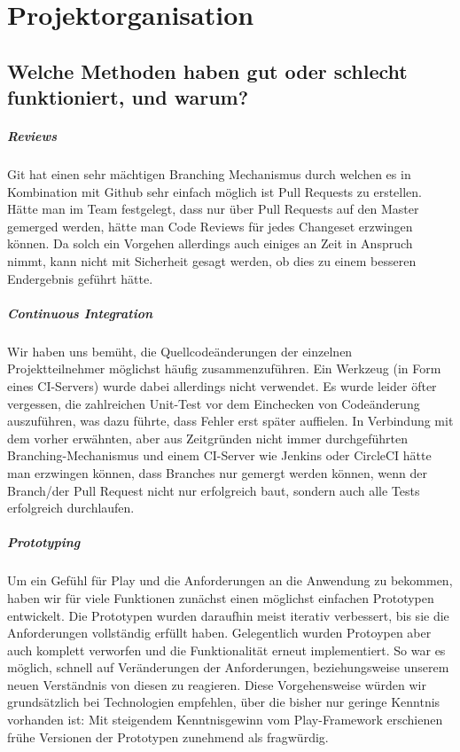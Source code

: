 \documentclass[12pt,DIV14,BCOR10mm,a4paper,parskip=half-,headsepline,headinclude,english,ngerman,bibliography=totocnumbered]{scrreprt}
\begin{document}
\vspace*{-3cm}

\tableofcontents  %

\chapter{Projektorganisation}


\section{Welche Methoden haben gut oder schlecht funktioniert, und warum?}

\paragraph{Reviews}
Git hat einen sehr mächtigen Branching Mechanismus durch welchen es in Kombination mit Github sehr einfach möglich ist Pull Requests zu erstellen. Hätte man im Team festgelegt, dass nur über Pull Requests auf den Master gemerged werden, hätte man Code Reviews für jedes Changeset erzwingen können. Da solch ein Vorgehen allerdings auch einiges an Zeit in Anspruch nimmt, kann nicht mit Sicherheit gesagt werden, ob dies zu einem besseren Endergebnis geführt hätte.

\paragraph{Continuous Integration}
Wir haben uns bemüht, die Quellcodeänderungen der einzelnen Projektteilnehmer möglichst häufig zusammenzuführen. Ein Werkzeug (in Form eines CI-Servers) wurde dabei allerdings nicht verwendet. Es wurde leider öfter vergessen, die zahlreichen Unit-Test vor dem Einchecken von Codeänderung auszuführen, was dazu führte, dass Fehler erst später auffielen.
In Verbindung mit dem vorher erwähnten, aber aus Zeitgründen nicht immer durchgeführten Branching-Mechanismus und einem CI-Server wie Jenkins oder CircleCI hätte man erzwingen können, dass Branches nur gemergt werden können, wenn der Branch/der Pull Request nicht nur erfolgreich baut, sondern auch alle Tests erfolgreich durchlaufen.

\paragraph{Prototyping}
Um ein Gefühl für Play und die Anforderungen an die Anwendung zu bekommen, haben wir für viele Funktionen zunächst einen möglichst einfachen Prototypen entwickelt. Die Prototypen wurden daraufhin meist iterativ verbessert, bis sie die Anforderungen vollständig erfüllt haben. Gelegentlich wurden Protoypen aber auch komplett verworfen und die Funktionalität erneut implementiert. So war es möglich, schnell auf Veränderungen der Anforderungen, beziehungsweise unserem neuen Verständnis von diesen zu reagieren. Diese Vorgehensweise würden wir grundsätzlich bei Technologien empfehlen, über die bisher nur geringe Kenntnis vorhanden ist: Mit steigendem Kenntnisgewinn vom Play-Framework erschienen frühe Versionen der Prototypen zunehmend als fragwürdig.
\end{document}
